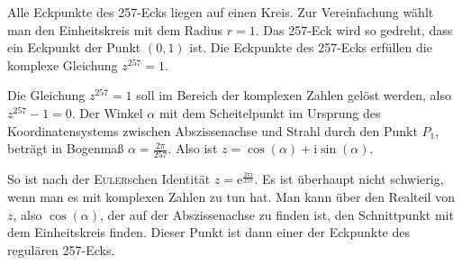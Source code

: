 \documentclass[11pt]{article}
\newcommand{\ii}{\mathrm{i}}
\begin{document}
Alle Eckpunkte des 257-Ecks liegen auf einen Kreis. Zur Vereinfachung wählt
man den Einheitskreis mit dem Radius $r = 1$. Das 257-Eck wird so gedreht,
dass ein Eckpunkt der Punkt $(0,1)$ ist. Die Eckpunkte des 257-Ecks erfüllen
die komplexe Gleichung $z^{257} = 1$.

Die Gleichung $z^{257} =1$ soll im Bereich der komplexen Zahlen gelöst werden,
also $z^{257} - 1 = 0$. Der Winkel $\alpha$ mit dem Scheitelpunkt im Ursprung
des Koordinatensystems zwischen Abszissenachse und Strahl durch den Punkt
$P_1$, beträgt in Bogenmaß $\alpha= \frac{2\pi}{257}$. Also ist $z =
\cos(\alpha) + \ii\sin(\alpha)$.

So ist nach der \textsc{Euler}schen Identität $z =
\mathrm{e}^{\frac{2\pi\ii}{257}}$.  Es ist überhaupt nicht schwierig, wenn man
es mit komplexen Zahlen zu tun hat. Man kann über den Realteil von $z$, also
$\cos(\alpha)$, der auf der Abszissenachse zu finden ist, den Schnittpunkt mit
dem Einheitskreis finden. Dieser Punkt ist dann einer der Eckpunkte des
regulären 257-Ecks.
\end{document}
